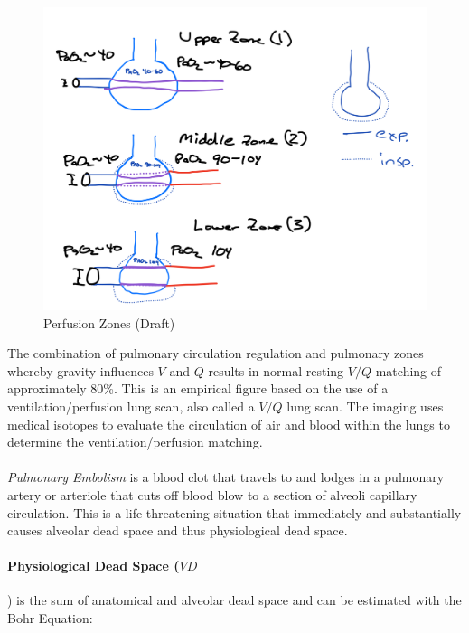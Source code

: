 \begin{figure}[!h]
    \centering
    \includegraphics[width=1.0 \linewidth]{./figure/ventilation/perfusion_zones.png}
    \caption{Perfusion Zones (Draft)}
    \label{fig:perfusion_zones}
\end{figure}

The combination of pulmonary circulation regulation and pulmonary zones whereby gravity influences $V$ and $Q$ results in normal resting $V/Q$ matching of approximately 80\%. This is an empirical figure based on the use of a ventilation/perfusion lung scan, also called a $V/Q$ lung scan.  The imaging uses medical isotopes to evaluate the circulation of air and blood within the lungs to determine the ventilation/perfusion matching. 

\paragraph{} \textit{Pulmonary Embolism} is a blood clot that travels to and lodges in a pulmonary artery or arteriole that cuts off blood blow to a section of alveoli capillary circulation. This is a life threatening situation that immediately and substantially causes alveolar dead space and thus physiological dead space.


\paragraph{Physiological Dead Space ($VD$}) is the sum of anatomical and alveolar dead space and can be estimated with the Bohr Equation:

